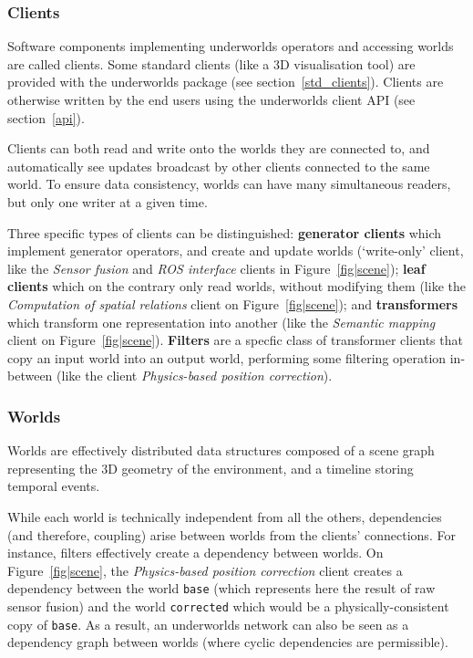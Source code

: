 \documentclass[letterpaper, 10pt, conference]{ieeeconf}
\newcommand{\uwds}{{\sc underworlds}\xspace}
\begin{document}
\subsubsection{Clients}

Software components implementing \uwds operators and accessing worlds are
called clients. Some standard clients (like a 3D visualisation tool) are
provided with the \uwds package (see section~\ref{std_clients}). Clients are
otherwise written by the end users using the \uwds client API (see
section~\ref{api}).

Clients can both read and write onto the worlds they are connected to, and
automatically see updates broadcast by other clients connected to the same
world. To ensure data consistency, worlds can have many simultaneous readers,
but only one writer at a given time.

Three specific types of clients can be distinguished: \textbf{generator
clients} which implement generator operators, and create and update worlds
(`write-only' client, like the \emph{Sensor fusion} and \emph{ROS interface}
clients in Figure~\ref{fig|scene}); \textbf{leaf clients} which on the contrary
only read worlds, without modifying them (like the \emph{Computation of spatial
relations} client on Figure~\ref{fig|scene}); and \textbf{transformers} which
transform one representation into another (like the \emph{Semantic mapping}
client on Figure~\ref{fig|scene}). \textbf{Filters} are a specfic class of
transformer clients that copy an input world into an output world, performing some
filtering operation in-between (like the client \textit{Physics-based position
correction}).

\subsubsection{Worlds}

Worlds are effectively distributed data structures composed of a scene graph
representing the 3D geometry of the environment, and a timeline storing temporal
events.

While each world is technically independent from all the others, dependencies
(and therefore, coupling) arise between worlds from the clients' connections.
For instance, filters effectively create a dependency between worlds. On
Figure~\ref{fig|scene}, the \textit{Physics-based position correction} client
creates a dependency between the world {\tt base} (which represents here the
result of raw sensor fusion) and the world {\tt corrected} which would be a
physically-consistent copy of {\tt base}.  As a result, an \uwds network can
also be seen as a dependency graph between worlds (where cyclic dependencies
are permissible).
\end{document}
